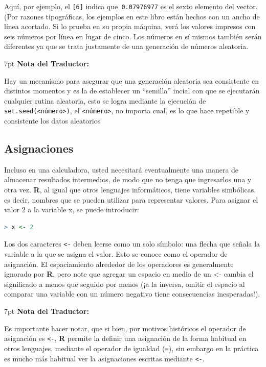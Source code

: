 \documentclass[spanish]{extbook}
\newenvironment{tradnote}{%
  \def\FrameCommand{%
    \hspace{1pt}%
    {\color{darkblue}\vrule width 2pt}%
    {\color{formalshade}\vrule width 4pt}%
    \colorbox{formalshade}%
  }%
  \vspace{12pt}
  \MakeFramed{\advance\hsize-\width\FrameRestore}%
  \noindent\hspace{-4.55pt}%
  \begin{adjustwidth}{}{7pt}%
  \vspace{1pt}%
  \textbf{Nota del Traductor:\\}%
}
{%
  \vspace{6pt}\end{adjustwidth}\endMakeFramed%
}
\numberwithin{equation}{section}
\numberwithin{figure}{section}
\begin{document}
Aquí, por ejemplo, el \texttt{{[}6{]}} indica que\texttt{ 0.07976977}
es el sexto elemento del vector. (Por razones tipográficas, los ejemplos
en este libro están hechos con un ancho de línea acortado. Si lo prueba
en su propia máquina, verá los valores impresos con seis números por
línea en lugar de cinco. Los números en sí mismos también serán diferentes
ya que se trata justamente de una generación de números aleatoria.

\begin{tradnote}

	Hay un mecanismo para asegurar que una generación aleatoria sea consistente
	en distintos momentos y es la de establecer un ``semilla'' incial con que
	se ejecutarán cualquier rutina aleatoria, esto se logra mediante la
	ejecución de \texttt{set.seed(<número>)}, el \texttt{<número>}, no importa
	cual, es lo que hace repetible y consistente los datos aleatorios

\end{tradnote} 

\subsection{Asignaciones}

Incluso en una calculadora, usted necesitará eventualmente una manera de
almacenar resultados intermedios, de modo que no tenga que ingresarlos una y
otra vez. \textbf{R}, al igual que otros lenguajes informáticos, tiene
variables simbólicas, es decir, nombres que se pueden utilizar para representar
valores. Para asignar el valor 2 a la variable x, se puede introducir:

\begin{lstlisting}[language=R]
> x <- 2
\end{lstlisting}


Los dos caracteres \texttt{<-} deben leerse como un solo símbolo: una flecha
que señala la variable a la que se asigna el valor. Esto se conoce como el
operador de asignación. El espaciamiento alrededor de los operadores es
generalmente ignorado por \textbf{R}, pero note que agregar un espacio en medio
de un <- cambia el significado a \textquotedbl{}menos que\textquotedbl{}
seguido por \textquotedbl{}menos\textquotedbl{} (¡a la inversa, omitir el
espacio al comparar una variable con un número negativo tiene consecuencias
inesperadas!). 

\begin{tradnote}
	Es importante hacer notar, que si bien, por motivos históricos
	el operador de asignación es \texttt{<-}, \textbf{R} permite la definir una asignación
	de la forma habitual en otros lenguajes, mediante el operador de igualdad (\texttt{=}),
	sin embargo en la práctica es mucho más habitual ver la asignaciones
	escritas mediante \texttt{<-}.
\end{tradnote} 
\end{document}
